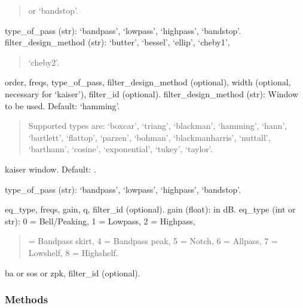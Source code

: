 \documentclass[letterpaper,10pt,english]{sphinxmanual}
\begin{document}
\begin{fulllineitems}
\begin{fulllineitems}
\begin{description}
\begin{quote}
\sphinxAtStartPar
or ‘bandstop’.
\end{quote}

\sphinxAtStartPar
type\_of\_pass (str): ‘bandpass’, ‘lowpass’, ‘highpass’, ‘bandstop’.
filter\_design\_method (str): ‘butter’, ‘bessel’, ‘ellip’, ‘cheby1’,
\begin{quote}

\sphinxAtStartPar
‘cheby2’.
\end{quote}

\sphinxAtStartPar
order, freqs, type\_of\_pass, filter\_design\_method (optional),
width (optional, necessary for ‘kaiser’), filter\_id (optional).
filter\_design\_method (str): Window to be used. Default: ‘hamming’.
\begin{quote}

\sphinxAtStartPar
Supported types are: ‘boxcar’, ‘triang’, ‘blackman’, ‘hamming’,
‘hann’, ‘bartlett’, ‘flattop’, ‘parzen’, ‘bohman’,
‘blackmanharris’, ‘nuttall’, ‘barthann’, ‘cosine’,
‘exponential’, ‘tukey’, ‘taylor’.
\end{quote}
\begin{description}
\sphinxAtStartPar
kaiser window. Default: .

\end{description}

\sphinxAtStartPar
type\_of\_pass (str): ‘bandpass’, ‘lowpass’, ‘highpass’, ‘bandstop’.

\sphinxAtStartPar
eq\_type, freqs, gain, q, filter\_id (optional).
gain (float): in dB.
eq\_type (int or str): 0 = Bell/Peaking, 1 = Lowpass, 2 = Highpass,
\begin{quote}

 = Bandpass skirt, 4 = Bandpass peak, 5 = Notch, 6 = Allpass,
7 = Lowshelf, 8 = Highshelf.
\end{quote}

\sphinxAtStartPar
ba or sos or zpk, filter\_id (optional).

\end{description}
\subsubsection*{Methods}



\end{fulllineitems}
\end{fulllineitems}
\end{document}
